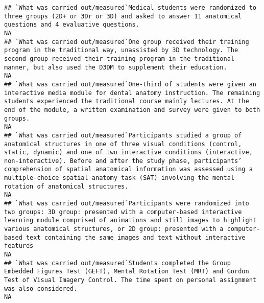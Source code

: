 \documentclass[]{article}
\begin{document}
\begin{verbatim}
## `What was carried out/measured`Medical students were randomized to three groups (2D+ or 3Dr or 3D) and asked to answer 11 anatomical questions and 4 evaluative questions.                                                                                                                                                                                                                                                                                                            NA
## `What was carried out/measured`One group received their training program in the traditional way, unassisted by 3D technology. The second group received their training program in the traditional manner, but also used the D3DM to supplement their education.                                                                                                                                                                                                                       NA
## `What was carried out/measured`One-third of students were given an interactive media module for dental anatomy instruction. The remaining students experienced the traditional course mainly lectures. At the end of the module, a written examination and survey were given to both groups.                                                                                                                                                                                          NA
## `What was carried out/measured`Participants studied a group of anatomical structures in one of three visual conditions (control, static, dynamic) and one of two interactive conditions (interactive, non-interactive). Before and after the study phase, participants’ comprehension of spatial anatomical information was assessed using a multiple-choice spatial anatomy task (SAT) involving the mental rotation of anatomical structures.                                       NA
## `What was carried out/measured`Participants were randomized into two groups: 3D group: presented with a computer-based interactive learning module comprised of animations and still images to highlight various anatomical structures, or 2D group: presented with a computer-based text containing the same images and text without interactive features                                                                                                                            NA
## `What was carried out/measured`Students completed the Group Embedded Figures Test (GEFT), Mental Rotation Test (MRT) and Gordon Test of Visual Imagery Control. The time spent on personal assignment was also considered.                                                                                                                                                                                                                                                            NA

\end{verbatim}
\end{document}
